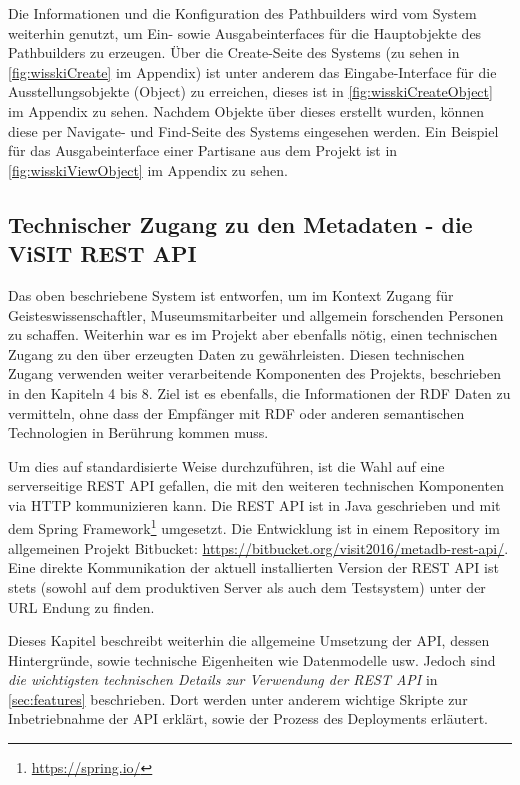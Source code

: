 \begin{description}
\end{description}

Die Informationen und die Konfiguration des Pathbuilders wird vom \wisski System weiterhin genutzt, um Ein- sowie Ausgabeinterfaces für die Hauptobjekte des Pathbuilders zu erzeugen. Über die Create-Seite des \wisski Systems (zu sehen in \autoref{fig:wisskiCreate} im Appendix) ist unter anderem das Eingabe-Interface für die Ausstellungsobjekte (Object) zu erreichen, dieses ist in \autoref{fig:wisskiCreateObject} im Appendix zu sehen. Nachdem Objekte über dieses erstellt wurden, können diese per Navigate- und Find-Seite des \wisski Systems eingesehen werden. Ein Beispiel für das Ausgabeinterface einer Partisane aus dem \visit Projekt ist in \autoref{fig:wisskiViewObject} im Appendix zu sehen.

\subsection{Technischer Zugang zu den Metadaten - die ViSIT REST API}\label{sec:rest}

Das oben beschriebene \wisski System ist entworfen, um im \visit Kontext Zugang für Geisteswissenschaftler, Museumsmitarbeiter und allgemein forschenden Personen zu schaffen. Weiterhin war es im \visit Projekt aber ebenfalls nötig, einen technischen Zugang zu den über \wisski erzeugten Daten zu gewährleisten. Diesen technischen Zugang verwenden weiter verarbeitende Komponenten des Projekts, beschrieben in den Kapiteln 4 bis 8. Ziel ist es ebenfalls, die Informationen der RDF Daten zu vermitteln, ohne dass der Empfänger mit RDF oder anderen semantischen Technologien in Berührung kommen muss.

Um dies auf standardisierte Weise durchzuführen, ist die Wahl auf eine serverseitige REST API gefallen, die mit den weiteren technischen Komponenten via HTTP kommunizieren kann. Die REST API ist in Java geschrieben und mit dem Spring Framework\footnote{\url{https://spring.io/}} umgesetzt. Die Entwicklung ist in einem Repository im allgemeinen \visit Projekt Bitbucket: \url{https://bitbucket.org/visit2016/metadb-rest-api/}. Eine direkte Kommunikation der aktuell installierten Version der REST API ist stets (sowohl auf dem produktiven Server als auch dem Testsystem) unter der URL Endung \texttt{} zu finden.

Dieses Kapitel beschreibt weiterhin die allgemeine Umsetzung der API, dessen Hintergründe, sowie technische Eigenheiten wie Datenmodelle usw. Jedoch sind \textit{die wichtigsten technischen Details zur Verwendung der \visit REST API} in \autoref{sec:features} beschrieben. Dort werden unter anderem wichtige Skripte zur Inbetriebnahme der API erklärt, sowie der Prozess des Deployments erläutert.


